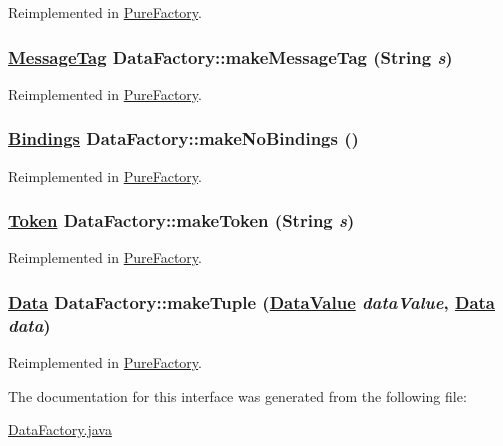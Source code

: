 Reimplemented in \hyperlink{classPureFactory_a6}{Pure\-Factory}.\hypertarget{interfaceDataFactory_a5}{
\subsubsection[makeMessageTag]{\setlength{\rightskip}{0pt plus 5cm}\hyperlink{interfaceMessageTag}{Message\-Tag} Data\-Factory::make\-Message\-Tag (String {\em s})}}
\label{interfaceDataFactory_a5}




Reimplemented in \hyperlink{classPureFactory_a4}{Pure\-Factory}.\hypertarget{interfaceDataFactory_a9}{
\subsubsection[makeNoBindings]{\setlength{\rightskip}{0pt plus 5cm}\hyperlink{interfaceBindings}{Bindings} Data\-Factory::make\-No\-Bindings ()}}
\label{interfaceDataFactory_a9}




Reimplemented in \hyperlink{classPureFactory_a7}{Pure\-Factory}.\hypertarget{interfaceDataFactory_a3}{
\subsubsection[makeToken]{\setlength{\rightskip}{0pt plus 5cm}\hyperlink{interfaceToken}{Token} Data\-Factory::make\-Token (String {\em s})}}
\label{interfaceDataFactory_a3}




Reimplemented in \hyperlink{classPureFactory_a2}{Pure\-Factory}.\hypertarget{interfaceDataFactory_a1}{
\subsubsection[makeTuple]{\setlength{\rightskip}{0pt plus 5cm}\hyperlink{interfaceData}{Data} Data\-Factory::make\-Tuple (\hyperlink{interfaceDataValue}{Data\-Value} {\em data\-Value}, \hyperlink{interfaceData}{Data} {\em data})}}
\label{interfaceDataFactory_a1}




Reimplemented in \hyperlink{classPureFactory_a11}{Pure\-Factory}.

The documentation for this interface was generated from the following file:\begin{CompactItemize}
\item 
\hyperlink{DataFactory_8java-source}{Data\-Factory.java}\end{CompactItemize}

